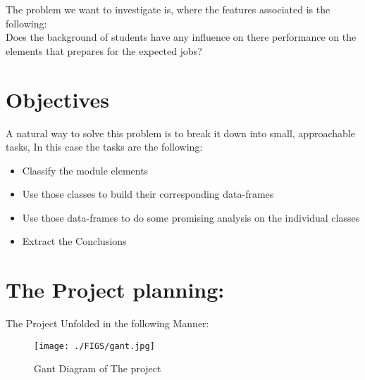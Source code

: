 \documentclass[12pt]{extreport}
\begin{document}
The problem we want to investigate is, where  the features associated is the following:\\
Does the background of students have any influence 
on there performance on the elements that prepares for the expected jobs?
 


\section{Objectives}
A natural way to solve this problem is to break it
down into small, approachable tasks, In this case the tasks are the following:\\



\begin{itemize}
	\item Classify the module elements
	\item Use those classes to build their corresponding data-frames
	\item Use those data-frames to do some promising analysis on the individual classes
	\item Extract the Conclusions 
\end{itemize}
 

\section{The Project planning:}
The Project Unfolded in the following Manner:\\

\begin{figure}[H]
	\centering
	\texttt{[image: ./FIGS/gant.jpg]}
	\caption{Gant Diagram of The project}
	\label{fig:1000}
\end{figure}


\begin{comment}


\begin{enumerate}
	\item Data Preparation (2 Weeks)
	\item Getting Machine Learning Certified (1 month and 2 weeks)
	\item Module Elements Classification to 6 classes (2 Weeks)
	\item Creation of The Corresponding data-frames for each class (2 Weeks)
	\item Analysis of The 1st and 2nd Classes (3 Weeks)
	\item Analysis of The 3rd and 4th Classes (3 Weeks)
	\item Analysis of The 5th and 6th Classes (3 Weeks)
		\item Extracting The conclusions (1 Weeks)
	\item Preparing the report and presentation (1 month)
		
\end{enumerate}
\end{comment}
\end{document}
